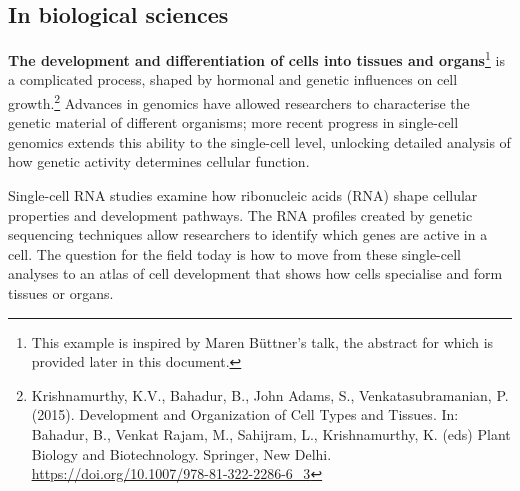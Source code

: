 \hypertarget{section}{%
\subsection{}\label{section}}

\hypertarget{in-biological-sciences}{%
\subsection{\texorpdfstring{In biological sciences
}{In biological sciences }}\label{in-biological-sciences}}

\textbf{The development and differentiation of cells into tissues and
organs}\footnote{This example is inspired by Maren Büttner's talk, the
  abstract for which is provided later in this document.} is a
complicated process, shaped by hormonal and genetic influences on cell
growth.\footnote{Krishnamurthy, K.V., Bahadur, B., John Adams, S.,
  Venkatasubramanian, P. (2015). Development and Organization of Cell
  Types and Tissues. In: Bahadur, B., Venkat Rajam, M., Sahijram, L.,
  Krishnamurthy, K. (eds) Plant Biology and Biotechnology. Springer, New
  Delhi.
  \href{https://doi.org/10.1007/978-81-322-2286-6_3}{\uline{https://doi.org/10.1007/978-81-322-2286-6\_3}}}
Advances in genomics have allowed researchers to characterise the
genetic material of different organisms; more recent progress in
single-cell genomics extends this ability to the single-cell level,
unlocking detailed analysis of how genetic activity determines cellular
function.

Single-cell RNA studies examine how ribonucleic acids (RNA) shape
cellular properties and development pathways. The RNA profiles created
by genetic sequencing techniques allow researchers to identify which
genes are active in a cell. The question for the field today is how to
move from these single-cell analyses to an atlas of cell development
that shows how cells specialise and form tissues or organs.

